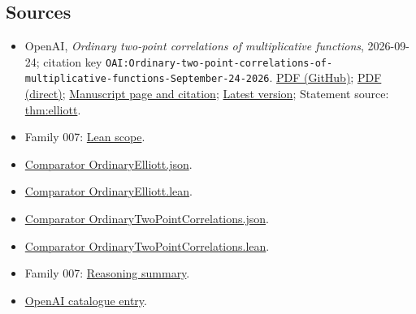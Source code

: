\documentclass[11pt]{article}
\begin{document}
\subsection{Sources}
\begin{itemize}
\item OpenAI, \emph{Ordinary two-point correlations of multiplicative functions}, 2026-09-24; citation key \texttt{OAI:Ordinary-two-point-correlations-of-multiplicative-functions-September-24-2026}. \href{https://github.com/openai/math/blob/adc7f1241b42e322a6451854ab7e4b4c146bf78a/preprints/Ordinary-two-point-correlations-of-multiplicative-functions-September-24-2026/final.pdf}{PDF (GitHub)}; \href{https://github.com/openai/math/raw/adc7f1241b42e322a6451854ab7e4b4c146bf78a/preprints/Ordinary-two-point-correlations-of-multiplicative-functions-September-24-2026/final.pdf}{PDF (direct)}; \href{https://github.com/openai/math/blob/adc7f1241b42e322a6451854ab7e4b4c146bf78a/preprints/Ordinary-two-point-correlations-of-multiplicative-functions-September-24-2026/README.md}{Manuscript page and citation}; \href{https://github.com/openai/math/blob/main/preprints/Ordinary-two-point-correlations-of-multiplicative-functions-September-24-2026/final.pdf}{Latest version}; Statement source: \href{https://github.com/openai/math/blob/adc7f1241b42e322a6451854ab7e4b4c146bf78a/preprints/Ordinary-two-point-correlations-of-multiplicative-functions-September-24-2026/build/introduction.tex\#L64}{thm:elliott}.
\item Family 007: \href{https://github.com/openai/math/blob/adc7f1241b42e322a6451854ab7e4b4c146bf78a/lean/docs/007.md}{Lean scope}.
\item \href{https://github.com/openai/math/blob/adc7f1241b42e322a6451854ab7e4b4c146bf78a/lean/ComparatorChallenges/OrdinaryElliott.json}{Comparator OrdinaryElliott.json}.
\item \href{https://github.com/openai/math/blob/adc7f1241b42e322a6451854ab7e4b4c146bf78a/lean/ComparatorChallenges/OrdinaryElliott.lean}{Comparator OrdinaryElliott.lean}.
\item \href{https://github.com/openai/math/blob/adc7f1241b42e322a6451854ab7e4b4c146bf78a/lean/ComparatorChallenges/OrdinaryTwoPointCorrelations.json}{Comparator OrdinaryTwoPointCorrelations.json}.
\item \href{https://github.com/openai/math/blob/adc7f1241b42e322a6451854ab7e4b4c146bf78a/lean/ComparatorChallenges/OrdinaryTwoPointCorrelations.lean}{Comparator OrdinaryTwoPointCorrelations.lean}.
\item Family 007: \href{https://github.com/openai/math/blob/adc7f1241b42e322a6451854ab7e4b4c146bf78a/reasoning\_traces/ordinary-two-point-correlations.pdf}{Reasoning summary}.
\item \href{https://github.com/openai/math/blob/adc7f1241b42e322a6451854ab7e4b4c146bf78a/CONTENTS.md}{OpenAI catalogue entry}.
\end{itemize}
\end{document}
